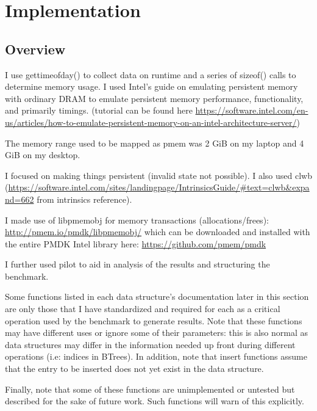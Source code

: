 \documentclass[twocolumn]{article}
\begin{document}
\section{Implementation}

\subsection{Overview}



I use gettimeofday() to collect data on runtime and a series of sizeof() calls
to determine memory usage.  I used Intel's guide on emulating persistent memory
with ordinary DRAM to emulate persistent memory performance, functionality, and
primarily timings. (tutorial can be found here
\url{https://software.intel.com/en-us/articles/how-to-emulate-persistent-memory-on-an-intel-architecture-server/})

The memory range used to be mapped as pmem was 2 GiB on my laptop and 4 GiB on
my desktop.

I focused on making things persistent (invalid state not possible). I also
used clwb
(\url{https://software.intel.com/sites/landingpage/IntrinsicsGuide/#text=clwb&expand=662}
from intrinsics reference).

I made use of libpmemobj for memory transactions (allocations/frees):
\url{http://pmem.io/pmdk/libpmemobj/}
which can be downloaded and installed with the entire PMDK Intel library here:
\url{https://github.com/pmem/pmdk}

I further used pilot to aid in analysis of the results and structuring the
benchmark.

Some functions listed in each data structure's documentation later in this
section are only those that I have standardized and required for each as a
critical operation used by the benchmark to generate results. Note that these
functions may have different uses or ignore some of their parameters: this is
also normal as data structures may differ in the information needed up front
during different operations (i.e: indices in BTrees). In addition, note that
insert functions assume that the entry to be inserted does not yet exist in the
data structure.

Finally, note that some of these functions are unimplemented or untested but
described for the sake of future work. Such functions will warn of this
explicitly.
\end{document}
